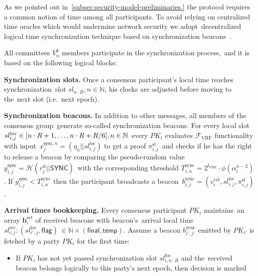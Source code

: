 As we pointed out in~\ref{subsec:security-model-preliminaries.} the protocol requires a common notion of time among all participants.
To avoid relying on centralized time oracles which would undermine network security we adopt\
decentralized logical time synchronization technique based on synchronization beacons~\cite{cryptoeprint:2019/838}.

All committees $V_{n}^k$ members participate in the synchronization process,\
and it is based on the following logical blocks:
\begin{legal}
    \item[]\textbf{Synchronization slots.} Once a consensus participant’s local time reaches synchronization\
    slot ${sl_{n \cdot R}, n \in \mathbb{N}}$, his clocks are adjusted before moving to the\
    next slot (i.e.\ next epoch).
    \item[]\textbf{Synchronization beacons.} In addition to other messages, all members of the consensus group\
    generate so-called synchronization beacons.
    For every local slot $sl_{i, j}^{\text{loc}} \in [n \cdot R + 1,\dots,n \cdot R + R \// 6], n \in \mathbb{N}$\
    every $PK_i$ evaluates $\mathcal{F}_{\text{VRF}}$ functionality with input\
    ${x_{j}^{\textsf{sync}, n} = (\eta_n || sl_{i, j}^{\text{loc}})}$ to get a proof $\pi_{i, j}^{\text{sl}}$\
    and checks if he has the right to release a beacon by comparing the pseudo-random value\
    ${y_{i, j}^{\textsf{sync}} = \mathcal{H}(r_{j}^{\text{sl}} || \textsf{SYNC})}$\
    with the corresponding threshold $T_{i, n}^{\text{sync}} = 2^{l_{\text{VRF}}} \cdot \phi(\alpha_{i}^{n - 2})$.
    If ${y_{i, j}^{\textsf{sync}} < T_{i, n}^{\text{sync}}}$ then the participant broadcasts a beacon\
    $b_{i, j}^{\text{sync}} = (v^{\text{vrf}}_i, sl_{i, j}^{\text{loc}}, \pi_{i, j}^{\text{sl}})$.
    \item[]\textbf{Arrival times bookkeeping.} Every consensus participant $PK_i$ maintains\
    an array $\mathbf{b}_i^{\text{set}}$ of received beacons with beacon's\
    arrival local time ${sl^{\text{rec}}_{i, j}: (sl_{i', j}^{\text{loc}}, \textsf{flag})\
    \in \mathbb{N} \times (\textsf{final}, \textsf{temp})}$.
    Assume a beacon $b_{i', j'}^{\text{sync}}$ emitted by $PK_{i'}$ is fetched by a party $PK_i$ for the first time:
    \begin{itemize}
        \item If $PK_i$ has not yet passed synchronization slot $sl_{i, n \cdot R}^{\text{loc}}$ and the\
        received beacon belongs logically to this party’s next epoch, then decision is marked\

\end{itemize}
\end{legal}

